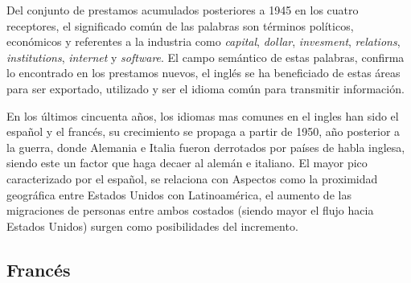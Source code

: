 Del conjunto de prestamos acumulados posteriores a 1945 en los cuatro receptores, el significado común de las palabras son términos políticos, económicos y referentes a la industria como  \textit{capital}, \textit{dollar}, \textit{invesment}, \textit{relations}, \textit{institutions}, \textit{internet} y \textit{software}. El campo semántico de estas palabras, confirma lo encontrado en los prestamos nuevos,  el inglés se ha beneficiado de estas áreas para ser exportado, utilizado y ser el idioma común para transmitir información. 


En los últimos cincuenta años, los idiomas mas comunes en el ingles han sido el español y el francés,  su crecimiento se propaga a partir de  1950, año posterior a la guerra, donde Alemania e Italia fueron derrotados por países de habla inglesa, siendo este un factor que haga decaer al alemán e italiano. El mayor pico  caracterizado por el español,  se relaciona con Aspectos como la proximidad geográfica entre Estados Unidos con Latinoamérica,  el aumento de las migraciones de personas entre ambos costados (siendo mayor el flujo hacia Estados Unidos) surgen como posibilidades del incremento.


\newpage
\subsection{Francés}

